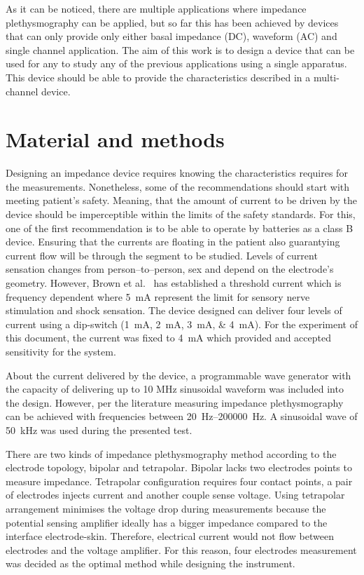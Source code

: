 As it can be noticed, there are multiple applications where impedance plethysmography can be applied, but so far this has been achieved by devices that can only provide only either basal impedance (DC), waveform (AC) and single channel application. The aim of this work is to design a device that can be used for any to study any of the previous applications using a single apparatus. This device should be able to provide the characteristics described in a multi-channel device.  


\section{Material and methods}
Designing an impedance device requires knowing the characteristics requires for the measurements. Nonetheless, some of the recommendations should start with meeting patient's safety. Meaning, that the amount of current to be driven by the device should be imperceptible within the limits of the safety standards. For this, one of the first recommendation is to be able to operate by batteries as a class B device. Ensuring that the currents are floating in the patient also guarantying current flow will be through the segment to be studied. Levels of current sensation changes from person–to–person, sex and depend on the electrode's geometry. However, Brown et al.~\cite{brown1998medical} has established a threshold current which is frequency dependent where \SI{5}{\mA} represent the limit for sensory nerve stimulation and shock sensation. The device designed can deliver four levels of current using a dip-switch (\SIlist{1;2;3;4}{\mA}). For the experiment of this document, the current was fixed to \SI{4}{\mA} which provided and accepted sensitivity for the system. 

About the current delivered by the device, a programmable wave generator with the capacity of delivering up to 10 MHz sinusoidal waveform was included into the design. However, per the literature measuring impedance plethysmography can be achieved with frequencies between \SIrange[scientific-notation = engineering]{20}{200000}{\hertz}. A sinusoidal wave of \SI{50}{\kilo\hertz} was used during the presented test. 

There are two kinds of impedance plethysmography method according to the electrode topology, bipolar and tetrapolar. Bipolar lacks two electrodes points to measure impedance. Tetrapolar configuration requires four contact points, a pair of electrodes injects current and another couple sense voltage. Using tetrapolar arrangement minimises the voltage drop during measurements because the potential sensing amplifier ideally has a bigger impedance compared to the interface electrode-skin. Therefore, electrical current would not flow between electrodes and the voltage amplifier. For this reason, four electrodes measurement was decided as the optimal method while designing the instrument. 

